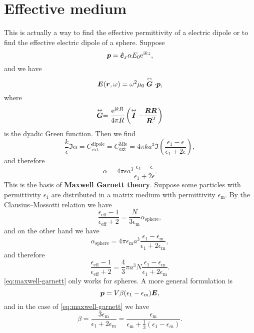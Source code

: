 \documentclass[hyperref, a4paper]{article}
\newcommand*{\ii}{\mathrm{i}}
\newcommand*{\ee}{\mathrm{e}}
\newcommand*{\concept}[1]{{\textbf{#1}}}
\renewcommand{\tensor}[1]{ \stackrel{\leftrightarrow}{\vb*{#1}}}
\begin{document}
\section{Effective medium}

This is actually a way to find the effective permittivity of a electric dipole or to find the effective electric
dipole of a sphere. Suppose 
\begin{equation}
    \vb*{p} = \vu*{e}_x \alpha E_0 \ee^{\ii k z},
\end{equation}
and we have 
\begin{equation}
    \vb*{E}(\vb*{r}, \omega) = \omega^2 \mu_0 \tensor{\vb*{G}} \cdot \vb*{p}, 
\end{equation}
where 
\begin{equation}
    \tensor{\vb*{G}} = \frac{\ee^{\ii k R}}{4 \pi R} \left( \tensor{\vb*{I}} - \frac{\vb*{R} \vb*{R}}{\vb*{R}^2} \right)
\end{equation}
is the dyadic Green function. Then we find 
\[
    \frac{k}{\epsilon} \Im \alpha = C_\text{ext}^\text{dipole} = C_\text{ext}^\text{Mie} = 4 \pi k a^3 \Im \left(\frac{\epsilon_1 - \epsilon}{\epsilon_1 + 2 \epsilon}\right),
\]
and therefore 
\begin{equation}
    \alpha = 4 \pi \epsilon a^3 \frac{\epsilon_1 - \epsilon}{\epsilon_1 + 2 \epsilon}.
\end{equation}
This is the basis of \concept{Maxwell Garnett theory}. Suppose some particles with permittivity $\epsilon_1$
are distributed in a matrix medium with permittivity $\epsilon_\text{m}$.
By the Clausius–Mossotti relation we have 
\[
    \frac{\epsilon_\text{eff} - 1}{\epsilon_\text{eff} + 2} = \frac{N}{3 \epsilon_\text{m}} \alpha_\text{sphere},
\]
and on the other hand we have 
\[
    \alpha_\text{sphere} = 4 \pi \epsilon_\text{m} a^3 \frac{\epsilon_1 - \epsilon_\text{m}}{\epsilon_1 + 2 \epsilon_\text{m}},
\]
and therefore 
\begin{equation}
    \frac{\epsilon_\text{eff} - 1}{\epsilon_\text{eff} + 2} = \frac{4}{3} \pi a^3 N \frac{\epsilon_1 - \epsilon_\text{m}}{\epsilon_1 + 2 \epsilon_\text{m}}.
    \label{eq:maxwell-garnett}
\end{equation}
\eqref{eq:maxwell-garnett} only works for spheres. A more general formulation is 
\begin{equation}
    \vb*{p} = V \beta (\epsilon_1 - \epsilon_\text{m}) \vb*{E},
\end{equation}
and in the case of \eqref{eq:maxwell-garnett} we have 
\begin{equation}
    \beta = \frac{3 \epsilon_\text{m}}{\epsilon_1 + 2 \epsilon_\text{m}} = \frac{\epsilon_\text{m}}{\epsilon_\text{m} + \frac{1}{3} (\epsilon_1 - \epsilon_m)}.
\end{equation}
\end{document}
